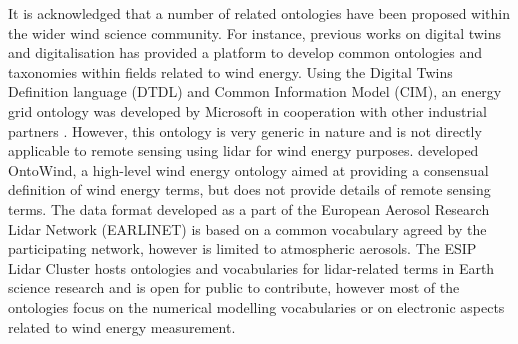 \documentclass[remotesensing,article,submit,pdftex,moreauthors]{Definitions/mdpi}
\begin{document}

It is acknowledged that a number of related ontologies have been proposed within the wider wind science community.
For instance, previous works on digital twins and digitalisation has provided a platform to develop common ontologies and taxonomies within fields related to wind energy. Using the Digital Twins Definition language (DTDL) and Common Information Model (CIM), an energy grid ontology was developed by Microsoft in cooperation with other industrial partners \cite{Ravi2021}.
However, this ontology is very generic in nature and is not directly applicable to remote sensing using lidar for wind energy purposes. \citet{Kucuk2018} developed OntoWind, a high-level wind energy ontology aimed at providing a consensual definition of wind energy terms, but does not provide details of remote sensing terms.
The data format developed as a part of the European Aerosol Research Lidar Network (EARLINET) \cite{ref-EARLINET}
is based on a common vocabulary agreed by the participating network, however is limited to atmospheric aerosols. The ESIP Lidar Cluster \cite{ref-ESIP} hosts ontologies and vocabularies for lidar-related terms in Earth science research and is open for public to contribute, however most of the ontologies focus on the numerical modelling vocabularies or on electronic aspects related to wind energy measurement.
\end{document}
